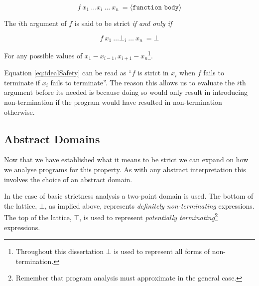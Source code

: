 \begin{equation*}
f \ x_{1} \ \dots x_{i} \ \dots \ x_{n} \ = \langle \texttt{function body} \rangle
\end{equation*}

The $i$th argument of $f$ is said to be strict \emph{if and only if}

\begin{equation}
f \ x_{1} \ \dots \bot_{i} \ \dots \ x_{n} \ =  \bot
\end{equation}
\label{eq:idealSafety}

For any possible values of $x_{1}-x_{i-1},x_{i+1}-x_{n}$\footnote{Throughout this
dissertation $\bot$ is used to represent all forms of non-termination.}.

Equation \ref{eq:idealSafety} can be read as ``$f$ is strict in $x_{i}$ when $f$
fails to terminate if $x_{i}$ fails to terminate''. The reason this allows us
to evaluate the $i$th argument before its needed is because doing so would only result
in introducing non-termination if the program would have resulted in non-termination
otherwise.

\subsection{Abstract Domains}

Now that we have established what it means to be strict we can expand on how we
analyse programs for this property. As with any abstract interpretation
 this involves the choice of an abstract domain.

In the case of basic strictness analysis a two-point domain is used. The bottom
of the lattice, $\bot$, as implied above, represents \emph{definitely
non-terminating} expressions. The top of the lattice, $\top$, is used to represent
\emph{potentially terminating}\footnote{Remember that program analysis must approximate
in the general case.} expressions.
